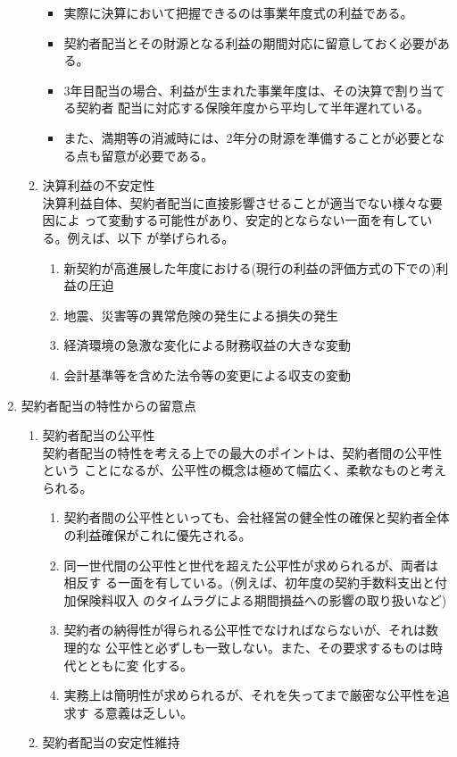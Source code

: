 \documentclass[report,gutter=10mm,fore-edge=10mm,uplatex,dvipdfmx]{jlreq}
\begin{document}
\begin{enumerate}
\begin{enumerate}
\begin{itemize}
 \item 実際に決算において把握できるのは事業年度式の利益である。
 \item 契約者配当とその財源となる利益の期間対応に留意しておく必要がある。
 \item 3年目配当の場合、利益が生まれた事業年度は、その決算で割り当てる契約者
配当に対応する保険年度から平均して半年遅れている。
 \item また、満期等の消滅時には、2年分の財源を準備することが必要となる点も留意が必要である。
\end{itemize}
 \item 決算利益の不安定性\\
決算利益自体、契約者配当に直接影響させることが適当でない様々な要因によ
って変動する可能性があり、安定的とならない一面を有している。例えば、以下
が挙げられる。
\begin{enumerate}
 \item 新契約が高進展した年度における(現行の利益の評価方式の下での)利益の圧迫
 \item 地震、災害等の異常危険の発生による損失の発生
 \item 経済環境の急激な変化による財務収益の大きな変動
 \item 会計基準等を含めた法令等の変更による収支の変動
\end{enumerate}
\end{enumerate}
 \item 契約者配当の特性からの留意点
\begin{enumerate}
 \item 契約者配当の公平性\\
契約者配当の特性を考える上での最大のポイントは、契約者間の公平性という
ことになるが、公平性の概念は極めて幅広く、柔軟なものと考えられる。
\begin{enumerate}
 \item 契約者間の公平性といっても、会社経営の健全性の確保と契約者全体の利益確保がこれに優先される。
 \item 同一世代間の公平性と世代を超えた公平性が求められるが、両者は相反す
る一面を有している。(例えば、初年度の契約手数料支出と付加保険料収入
のタイムラグによる期間損益への影響の取り扱いなど)
 \item 契約者の納得性が得られる公平性でなければならないが、それは数理的な
公平性と必ずしも一致しない。また、その要求するものは時代とともに変
化する。
 \item 実務上は簡明性が求められるが、それを失ってまで厳密な公平性を追求す
る意義は乏しい。
\end{enumerate}
 \item 契約者配当の安定性維持

\end{enumerate}
\end{enumerate}
\end{document}
